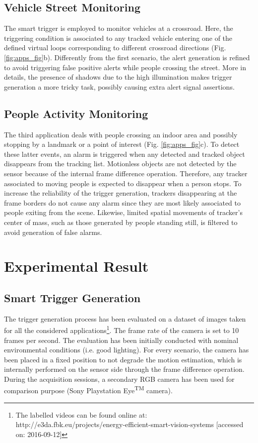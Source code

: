 \documentclass[journal]{IEEEtran}
\begin{document}
\subsection{Vehicle Street Monitoring}
The smart trigger is employed to monitor vehicles at a crossroad. Here, the triggering condition is associated to any tracked vehicle entering one of the defined virtual loops corresponding to different crossroad directions (Fig. \ref{fig:apps_fig}b). 
Differently from the first scenario, the alert generation is refined to avoid triggering false positive alerts while people crossing the street. More in details, the presence of shadows due to the high illumination makes trigger generation a more tricky task, possibly causing extra alert signal assertions.  


\subsection{People Activity Monitoring}
 
The third application deals with people crossing an indoor area and possibly stopping by a landmark or a point of interest (Fig. \ref{fig:apps_fig}c). 
To detect these latter events, an alarm is triggered when any detected and tracked object disappears from the tracking list. Motionless objects are not detected by the sensor because of the internal frame difference operation. Therefore, any tracker associated to moving people is expected to disappear when a person stops. To increase the reliability of the trigger generation, trackers disappearing at the frame borders do not cause any alarm since they are most likely associated to people exiting from the scene. Likewise, limited spatial movements of tracker's center of mass, such as those generated by people standing still, is filtered to avoid generation of false alarms.


\section{Experimental Result}
\label{sec:Eval}

\subsection{Smart Trigger Generation}
The trigger generation process has been evaluated on a dataset of images taken for all the considered applications\footnote{The labelled videos can be found online at: http://e3da.fbk.eu/projects/energy-efficient-smart-vision-systems [accessed on: 2016-09-12]}. The frame rate of the camera is set to 10 frames per second. The evaluation has been initially conducted with nominal environmental conditions (i.e. good lighting).
For every scenario, the camera has been placed in a fixed position to not degrade the motion estimation, which is internally performed on the sensor side through the frame difference operation. During the acquisition sessions, a secondary RGB camera has been used for comparison purpose (Sony Playstation Eye\textsuperscript{TM} camera).
\end{document}
